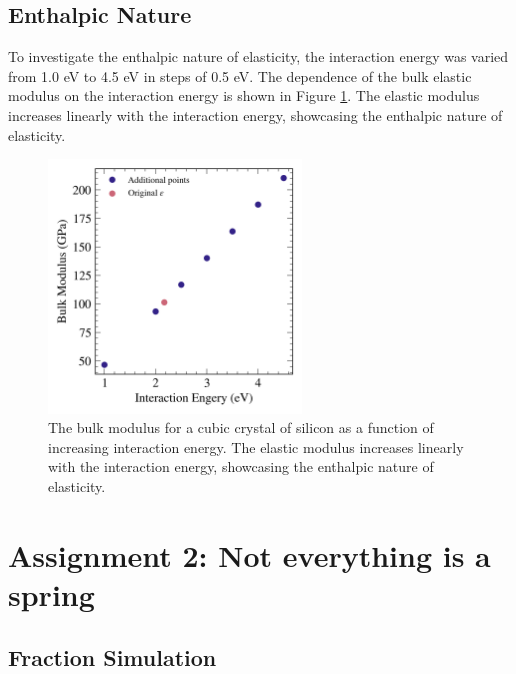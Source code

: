 \documentclass[10pt,a4paper]{labreport}
\begin{document}
\subsection{Enthalpic Nature}
To investigate the enthalpic nature of elasticity, the interaction energy was varied from 1.0 eV to 4.5 eV in steps of 0.5 eV. 
The dependence of the bulk elastic modulus on the interaction energy is shown in Figure \ref{fig:ass1_moduli-vs-epsilon}. The elastic modulus increases linearly with the interaction energy, showcasing the enthalpic nature of elasticity.
\begin{figure}[h]
  \centering
  \includegraphics[width = 0.6\textwidth]{figs/ass1_moduli-vs-epsilon.png}
  \caption{The bulk modulus for a cubic crystal of silicon as a function of increasing interaction energy. The elastic modulus increases linearly with the interaction energy, showcasing the enthalpic nature of elasticity.}
  \label{fig:ass1_moduli-vs-epsilon}
\end{figure}

\newpage
\section{Assignment 2: Not everything is a spring}
\subsection{Fraction Simulation}
\end{document}
